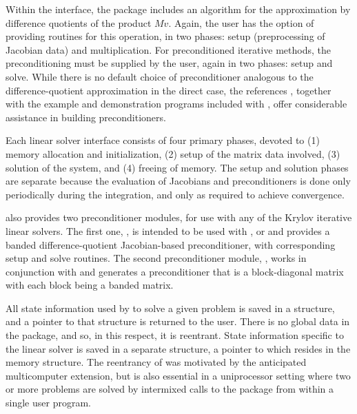 Within the {\cvspils} interface, the package includes an algorithm for
the approximation by difference quotients of the product $Mv$. Again,
the user has the option of providing routines for this operation, in
two phases: setup (preprocessing of Jacobian data) and multiplication.
For preconditioned iterative methods,  
the preconditioning must be supplied by the user, again in two phases: 
setup and solve.  While there is no
default choice of preconditioner analogous to the difference-quotient
approximation in the direct case, the references
\cite{BrHi:89,Byr:92}, together with the example and demonstration
programs included with {\cvode}, offer considerable assistance in
building preconditioners. 

Each {\cvode} linear solver interface consists of four primary phases,
devoted to (1) memory allocation and initialization, (2) setup of the
matrix data involved, (3) solution of the system, and (4) freeing of memory.  
The setup and solution phases are separate because the evaluation of
Jacobians and preconditioners is done only periodically during the
integration, and only as required to achieve convergence. 

{\cvode} also provides two preconditioner modules, for use with any of
the Krylov iterative linear solvers. The first one, {\cvbandpre},
is intended to be used with {\nvecs}, {\nvecopenmp} or {\nvecpthreads}
and provides a banded difference-quotient Jacobian-based
preconditioner, with corresponding setup and solve routines.
The second preconditioner module, {\cvbbdpre}, works in conjunction
with {\nvecp} and generates a preconditioner that is a block-diagonal
matrix with each block being a banded matrix.

All state information used by {\cvode} to solve a given problem is saved
in a structure, and a pointer to that structure is returned to the
user.  There is no global data in the {\cvode} package, and so, in this
respect, it is reentrant. State information specific to the linear
solver is saved in a separate structure, a pointer to which resides in
the {\cvode} memory structure. The reentrancy of {\cvode} was motivated
by the anticipated multicomputer extension, but is also essential
in a uniprocessor setting where two or more problems are solved by
intermixed calls to the package from within a single user program.
